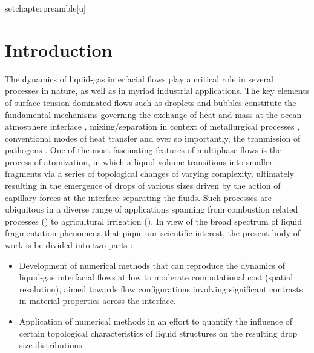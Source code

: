setchapterpreamble[u]{\margintoc}
\chapter{Introduction} 


The dynamics of liquid-gas interfacial flows play a critical role in several processes in nature, 
as well as in myriad industrial applications. 
The key elements of surface tension dominated flows such as droplets and bubbles constitute the  
fundamental mechanisms governing the exchange of heat and mass at the ocean-atmosphere interface \cite{seinfeld1998air,deike}, 
mixing/separation in context of metallurgical processes \cite{johansen1988fluid,metal},  
conventional modes of heat transfer \cite{deckwer1980mechanism,bubble}
and ever so importantly, the tranmission of pathogens \cite{lydia_1,lydia_2}. 
One of the most fascinating features of multiphase flows is the process of atomization, 
in which a liquid volume transitions into smaller fragments via a series of topological 
changes of varying complexity, ultimately resulting in the emergence of drops of various sizes
driven by the action of capillary forces at the interface separating the fluids.  
Such processes are ubiquitous in a diverse range of applications spanning from combustion related processes 
(\cite{lefebvre2017atomization,bayvel1993liquid}) to agricultural irrigation (\cite{lake1977effect,reichenberger2007mitigation}).    
In view of the broad spectrum of liquid fragmentation phenomena that pique our scientific interest, 
the present body of work is be divided into two parts :  






\begin{itemize}
	\item Development of numerical methods that can reproduce the dynamics of liquid-gas interfacial flows
		at low to moderate computational cost (spatial resolution), aimed towards flow configurations 
		involving significant contrasts in material properties across the interface. 
	\item Application of numerical methods in an effort to quantify the influence of certain topological
		characteristics of liquid structures on the resulting drop size distributions.  
\end{itemize}

